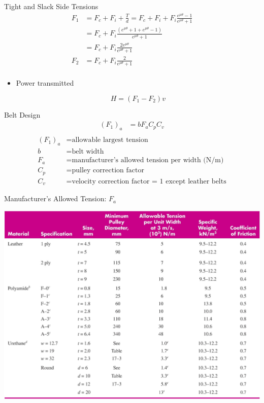 \documentclass[10pt, svgnames]{beamer}
\begin{document}
\begin{frame}[label={sec:org85ffcf2}]{Tight and Slack Side Tensions}
\begin{align*}
  F_{1} &= F_{c} + F_{i} + \frac{T}{d} = F_{c} + F_{i} + F_{i} \frac{e^{\mu\theta} - 1}{e^{\mu\theta} + 1} \\
        &= F_{c} + F_{i}\frac{\left( e^{\mu\theta} + 1 + e^{\mu\theta} - 1 \right)}{e^{\mu\theta} + 1} \\
        &= F_{c} + F_{i}\frac{2e^{\mu\theta}}{e^{\mu\theta} + 1} \\
  F_{2} &= F_{c} + F_{i}\frac{2}{e^{\mu\theta} + 1} \\
\end{align*}

\begin{itemize}
\item Power transmitted

$$H = (F_1 - F_2) v$$
\end{itemize}
\end{frame}

\begin{frame}[label={sec:org061c7db}]{Belt Design}
\begin{align*}
    (F_1)_a &= b F_a C_p C_v \\
\end{align*}
\begin{align*}
    \left( F_1 \right)_a &= \text{allowable largest tension} \\
    b &= \text{belt width} \\
    F_a &= \text{manufacturer's allowed tension per width (N/m)} \\
    C_p &= \text{pulley correction factor} \\
    C_v &= \text{velocity correction factor = 1 except leather belts}
\end{align*}
\end{frame}

\begin{frame}[label={sec:org9c89844}]{Manufacturer's Allowed Tension: \(F_a\)}
\begin{center}
\includegraphics[width=\textwidth]{./pictures/belt-allowable-tension.png}
\end{center}
\end{frame}
\end{document}
